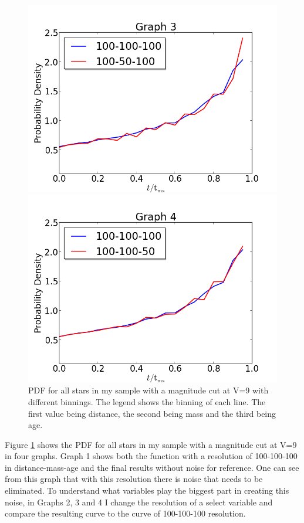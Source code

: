 \documentclass[a4paper,10pt]{article}
\begin{document}
\begin{figure}[h!]
\begin{minipage}{0.49\textwidth}
   \includegraphics[width=\textwidth]{100-50-100}
  \end{minipage}
  \begin{minipage}{0.49\textwidth}
   \includegraphics[width=\textwidth]{100-100-50}
  \end{minipage}
   \caption{PDF for all stars in my sample with a magnitude cut at V=9 with different binnings.
   The legend shows the binning of each line. The first value being distance, the second being mass and the third being age.\label{binnings}}
 \end{figure}
 
 Figure \ref{binnings} shows the PDF for all stars in my sample with a magnitude cut at V=9 in four graphs. 
 Graph 1 shows both the function with a resolution of 100-100-100 in distance-mass-age and the final results without noise for reference. 
 One can see from this
 graph that with this resolution there is noise that needs to be eliminated. 
 To understand what variables play the biggest part in creating this noise, in Graphs 2, 3 and 4 I change the resolution of a select 
 variable and compare the resulting curve to the curve of 100-100-100 resolution.\\
 
\end{document}
